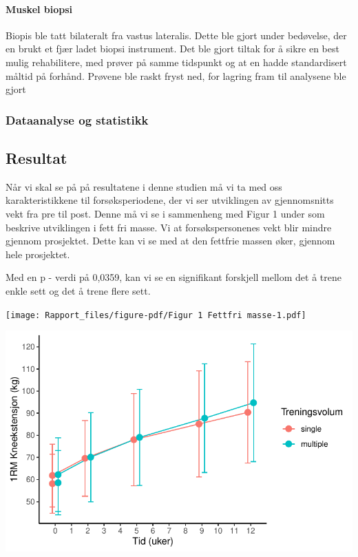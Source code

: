 \documentclass[
  letterpaper,
  DIV=11,
  numbers=noendperiod]{scrartcl}
\let\oldparagraph\paragraph
\renewcommand{\paragraph}[1]{\oldparagraph{#1}\mbox{}}
\begin{document}
\hypertarget{muskel-biopsi}{%
\paragraph{Muskel biopsi}\label{muskel-biopsi}}

Biopis ble tatt bilateralt fra vastus lateralis. Dette ble gjort under
bedøvelse, der en brukt et fjær ladet biopsi instrument. Det ble gjort
tiltak for å sikre en best mulig rehabilitere, med prøver på samme
tidspunkt og at en hadde standardisert måltid på forhånd. Prøvene ble
raskt fryst ned, for lagring fram til analysene ble gjort

\hypertarget{dataanalyse-og-statistikk}{%
\subsubsection{Dataanalyse og
statistikk}\label{dataanalyse-og-statistikk}}

\hypertarget{resultat}{%
\subsection{Resultat}\label{resultat}}

Når vi skal se på på resultatene i denne studien må vi ta med oss
karakteristikkene til forsøksperiodene, der vi ser utviklingen av
gjennomsnitts vekt fra pre til post. Denne må vi se i sammenheng med
Figur 1 under som beskrive utviklingen i fett fri masse. Vi at
forsøkspersonenes vekt blir mindre gjennom prosjektet. Dette kan vi se
med at den fettfrie massen øker, gjennom hele prosjektet.

Med en p - verdi på 0,0359, kan vi se en signifikant forskjell mellom
det å trene enkle sett og det å trene flere sett.

\texttt{[image: Rapport\_files/figure-pdf/Figur 1 Fettfri masse-1.pdf]}

\includegraphics{Rapport_files/figure-pdf/Figur 2 Utvikling 1 RM kjenekstensjon-1.pdf}
\end{document}
